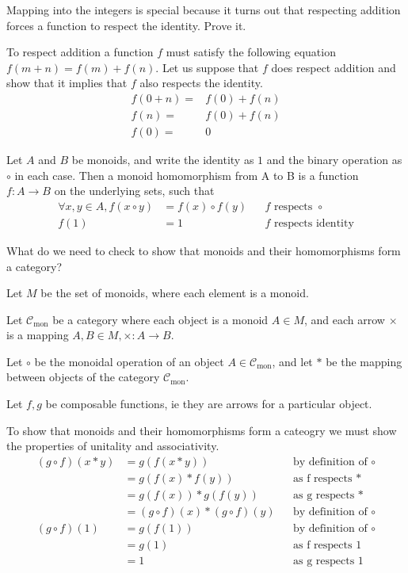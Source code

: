 \begin{ttta}
Mapping into the integers is special because it turns out that respecting
addition forces a function to respect the identity. Prove it.
\end{ttta}
\begin{proofitem}
\item To respect addition a function $f$ must satisfy the following equation $f(m+n) =
f(m)+f(n)$.  Let us suppose that $f$ does respect addition and show that it
implies that $f$ also respects the identity.
\begin{align*}
    f(0+n) =& f(0) + f(n)\\
    f(n) =& f(0) + f(n)\\
    f(0) =& 0
\end{align*}
\end{proofitem}
\begin{definition}
Let $A$ and $B$ be monoids, and write the identity as $1$ and the
binary operation as $\circ$ in each case. Then a monoid homomorphism from A to
B is a function $f:A\rightarrow B$ on the underlying sets, such that
\begin{align*}
    \forall x, y \in A, f(x \circ y) &= f(x) \circ f(y)&&f\text{ respects }\circ\\
    f(1)&=1&&f\text{ respects identity}
\end{align*}
\end{definition}

\begin{ttta}
What do we need to check to show that monoids and their homomorphisms form a
category?
\end{ttta}
\begin{proofitem}
\item Let $M$ be the set of monoids, where each element is a monoid.
\item Let $\mathcal{C}_\text{mon}$ be a category where each object is a monoid
    $A\in M$, and each arrow $\times$ is a mapping $A,B \in M, \times:
    A\rightarrow B$.
\item Let $\circ$ be the monoidal operation of an object
    $A\in\mathcal{C}_\text{mon}$, and let $\ast$
    be the mapping between objects of the category $\mathcal{C}_\text{mon}$.
\item Let $f, g$ be composable functions, ie they are arrows for a particular
    object.
\item To show that monoids and their homomorphisms form a cateogry we must show
    the properties of unitality and associativity.
\begin{align}
(g\circ f)(x\ast y)&= g(f(x\ast y)) &&\text{by definition of }\circ\\
&= g(f(x)\ast f(y)) &&\text{as f respects }\ast\\
&= g(f(x))\ast g(f(y)) &&\text{as g respects }\ast\\
&= (g\circ f)(x)\ast (g\circ f)(y) &&\text{by definition of }\circ\\
(g\circ f)(1)&= g(f(1)) &&\text{by definition of }\circ\\
&= g(1) &&\text{as f respects }1\\
&= 1 &&\text{as g respects }1
\end{align}
\end{proofitem}

